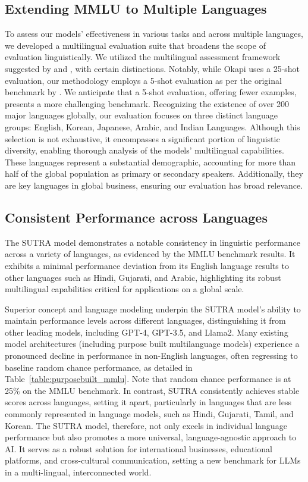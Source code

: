 \documentclass{article}
\begin{document}
 

\subsection{Extending MMLU to Multiple Languages}
To assess our models' effectiveness in various tasks and across multiple languages, we developed a multilingual evaluation suite that broadens the scope of evaluation linguistically. We utilized the multilingual assessment framework suggested by \citet{lai2023okapi} and \citet{ustun2024aya}, with certain distinctions. Notably, while Okapi uses a 25-shot evaluation, our methodology employs a 5-shot evaluation as per the original benchmark by \citet{hendrycks2021measuring}. We anticipate that a 5-shot evaluation, offering fewer examples, presents a more challenging benchmark. Recognizing the existence of over 200 major languages globally, our evaluation focuses on three distinct language groups: English, Korean, Japanese, Arabic, and Indian Languages. Although this selection is not exhaustive, it encompasses a significant portion of linguistic diversity, enabling thorough analysis of the models' multilingual capabilities. These languages represent a substantial demographic, accounting for more than half of the global population as primary or secondary speakers. Additionally, they are key languages in global business, ensuring our evaluation has broad relevance.

\subsection{Consistent Performance across Languages}

The SUTRA model demonstrates a notable consistency in linguistic performance across a variety of languages, as evidenced by the MMLU benchmark results. It exhibits a minimal performance deviation from its English language results to other languages such as Hindi, Gujarati, and Arabic, highlighting its robust multilingual capabilities critical for applications on a global scale.

Superior concept and language modeling underpin the SUTRA model's ability to maintain performance levels across different languages, distinguishing it from other leading models, including GPT-4, GPT-3.5, and Llama2.
Many existing model architectures (including purpose built multilanguage models) experience a pronounced decline in performance in non-English languages, often regressing to baseline random chance performance, as detailed in Table~\ref{table:purposebuilt_mmlu}. Note that random chance performance is at 25\% on the MMLU benchmark. In contrast, SUTRA consistently achieves stable scores across languages, setting it apart, particularly in languages that are less commonly represented in language models, such as Hindi, Gujarati, Tamil, and Korean.
The SUTRA model, therefore, not only excels in individual language performance but also promotes a more universal, language-agnostic approach to AI.
It serves as a robust solution for international businesses, educational platforms, and cross-cultural communication, setting a new benchmark for LLMs in a multi-lingual, interconnected world.
\end{document}
